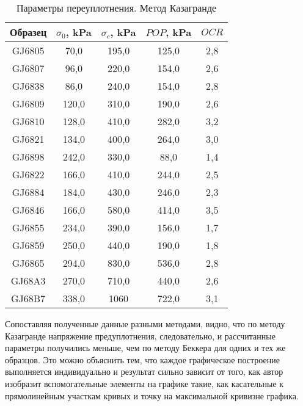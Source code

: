   \begin{table}[]
    \centering
    \begin{threeparttable}
      \caption{Параметры переуплотнения. Метод Казагранде}\label{tab:komp1}
    \begin{tabular}{|c|c|c|c|c|}
    \hline
    Образец  & $\sigma_0$, \si{\kilo\Pa} & $\sigma_c$, \si{\kilo\Pa} & $POP$, \si{\kilo\Pa}   & $OCR$ \\ \hline
    GJ6805 & 70,0  & 195,0 & 125,0 & 2,8 \\ \hline
    GJ6807 & 96,0  & 220,0 & 154,0 & 2,6 \\ \hline
    GJ6838 & 86,0  & 240,0 & 154,0 & 2,8 \\ \hline
    GJ6809 & 120,0 & 310,0 & 190,0 & 2,6 \\ \hline
    GJ6810 & 128,0 & 410,0 & 282,0 & 3,2 \\ \hline
    GJ6821 & 134,0 & 400,0 & 264,0 & 3,0 \\ \hline
    GJ6898 & 242,0 & 330,0 & 88,0  & 1,4 \\ \hline
    GJ6822 & 166,0 & 410,0 & 244,0 & 2,5 \\ \hline
    GJ6884 & 184,0 & 430,0 & 246,0 & 2,3 \\ \hline
    GJ6846 & 166,0 & 580,0 & 414,0 & 3,5 \\ \hline
    GJ6855 & 234,0 & 390,0 & 156,0 & 1,7 \\ \hline
    GJ6859 & 250,0 & 440,0 & 190,0 & 1,8 \\ \hline
    GJ6865 & 294,0 & 830,0 & 536,0 & 2,8 \\ \hline
    GJ68A3 & 270,0 & 710,0 & 440,0 & 2,6 \\ \hline
    GJ68B7 & 338,0 & 1060  & 722,0 & 3,1 \\ \hline
    \end{tabular}
  \end{threeparttable}
    \end{table}

Сопоставляя полученные данные разными методами, 
видно, что по методу Казагранде напряжение предуплотнения, 
следовательно, и рассчитанные параметры получились 
меньше, чем по методу Беккера для одних и тех же образцов.
Это можно объяснить тем, что каждое графическое построение 
выполняется индивидуально и результат сильно зависит от 
того, как автор изобразит вспомогательные элементы 
на графике такие, как касательные к прямолинейным участкам 
кривых и точку на максимальной кривизне графика.
